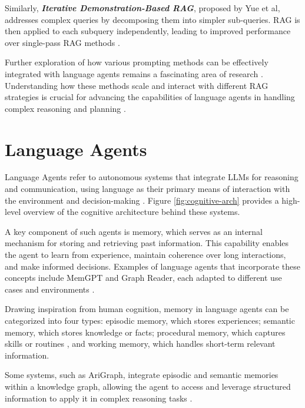 \noindent Similarly, \textit{\textbf{Iterative Demonstration-Based RAG}}, proposed by Yue et al, addresses complex queries by decomposing them into simpler sub-queries. RAG is then applied to each subquery independently, leading to improved performance over single-pass RAG methods \cite{yue2024inferencescalinglongcontextretrieval}.

\noindent Further exploration of how various prompting methods can be effectively integrated with language agents remains a fascinating area of research \cite{trivedi-etal-2023-interleaving}. Understanding how these methods scale and interact with different RAG strategies is crucial for advancing the capabilities of language agents in handling complex reasoning and planning \cite{language-agent-tutorial}.

\section{Language Agents}

Language Agents refer to autonomous systems that integrate LLMs for reasoning and communication, using language as their primary means of interaction with the environment and decision-making \cite{language-agent-tutorial}. Figure \ref{fig:cognitive-arch} provides a high-level overview of the cognitive architecture behind these systems.

\noindent A key component of such agents is memory, which serves as an internal mechanism for storing and retrieving past information. This capability enables the agent to learn from experience, maintain coherence over long interactions, and make informed decisions. Examples of language agents that incorporate these concepts include MemGPT and Graph Reader, each adapted to different use cases and environments \cite{packer2024memgptllmsoperatingsystems}\cite{li2024graphreaderbuildinggraphbasedagent}.

\noindent Drawing inspiration from human cognition, memory in language agents can be categorized into four types: episodic memory, which stores experiences; semantic memory, which stores knowledge or facts; procedural memory, which captures skills or routines \cite{sumers2024cognitive}, and working memory, which handles short-term relevant information. 

\noindent Some systems, such as AriGraph, integrate episodic and semantic memories within a knowledge graph, allowing the agent to access and leverage structured information to apply it in complex reasoning tasks \cite{anokhin2024arigraphlearningknowledgegraph}.

